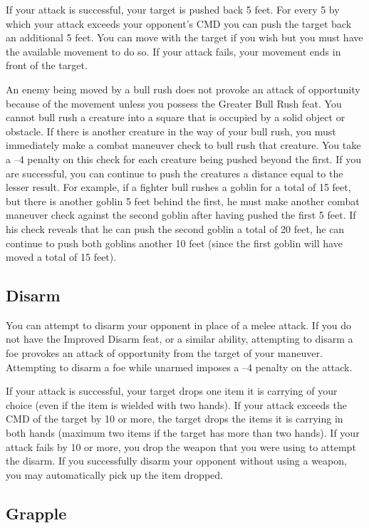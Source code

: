 If your attack is successful, your target is pushed back 5 feet. For every 5 by which your attack exceeds your opponent's CMD you can push the target back an additional 5 feet. You can move with the target if you wish but you must have the available movement to do so. If your attack fails, your movement ends in front of the target.
				
An enemy being moved by a bull rush does not provoke an attack of opportunity because of the movement unless you possess the Greater Bull Rush feat. You cannot bull rush a creature into a square that is occupied by a solid object or obstacle. If there is another creature in the way of your bull rush, you must immediately make a combat maneuver check to bull rush that creature. You take a --4 penalty on this check for each creature being pushed beyond the first. If you are successful, you can continue to push the creatures a distance equal to the lesser result. For example, if a fighter bull rushes a goblin for a total of 15 feet, but there is another goblin 5 feet behind the first, he must make another combat maneuver check against the second goblin after having pushed the first 5 feet. If his check reveals that he can push the second goblin a total of 20 feet, he can continue to push both goblins another 10 feet (since the first goblin will have moved a total of 15 feet).
				
\subsection{Disarm}

				
You can attempt to disarm your opponent in place of a melee attack. If you do not have the Improved Disarm feat, or a similar ability, attempting to disarm a foe provokes an attack of opportunity from the target of your maneuver. Attempting to disarm a foe while unarmed imposes a --4 penalty on the attack.
				
If your attack is successful, your target drops one item it is carrying of your choice (even if the item is wielded with two hands). If your attack exceeds the CMD of the target by 10 or more, the target drops the items it is carrying in both hands (maximum two items if the target has more than two hands). If your attack fails by 10 or more, you drop the weapon that you were using to attempt the disarm. If you successfully disarm your opponent without using a weapon, you may automatically pick up the item dropped.
				
\subsection{Grapple}

